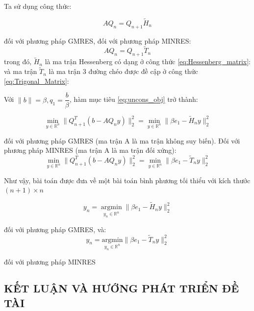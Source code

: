 \documentclass[14pt, a4paper]{article}
\numberwithin{equation}{section}
\numberwithin{algorithm}{section}
\numberwithin{figure}{section}
\numberwithin{dl}{section}
\numberwithin{md}{section}
\numberwithin{bd}{section}
\numberwithin{dn}{section}
\begin{document}
Ta sử dụng công thức:

\begin{equation}
    AQ_n = Q_{n+1}\widetilde{H}_n
\end{equation}

đối với phương pháp GMRES, đối với phương pháp MINRES:
\begin{equation}
    AQ_n = Q_{n+1} \widetilde{T}_n
\end{equation}
trong đó, $\widetilde{H}_n$ là ma trận Hessenberg có dạng ở công thức \ref{eq:Hessenberg_matrix}:
và ma trận $\widetilde{T}_n$ là ma trận 3 đường chéo được đề cập ở công thức \ref{eq:Trigonal_Matrix}:

Với $\lVert b \rVert = \beta, q_1 = \dfrac{b}{\beta}$, hàm mục tiêu \eqref{eq:uncons_obj} trở thành:

\begin{equation}
    \min_{y \in \mathbb{R}^{n}}  \lVert Q_{n+1}^T(b - AQ_n y) \rVert_2^2=\min_{y \in \mathbb{R}^{n}} \lVert \beta e_1 - \widetilde{H}_n y\rVert_2^2
\end{equation}

đối với phương pháp GMRES (ma trận A là ma trận không suy biến).
Đối với phương pháp MINRES (ma trận A là ma trận đối xứng):
\begin{equation}
    \min_{y \in \mathbb{R}^{n}}  \lVert Q_{n+1}^T(b - AQ_n y) \rVert_2^2=\min_{y \in \mathbb{R}^{n}} \lVert \beta e_1 - \widetilde{T}_n y\rVert_2^2
\end{equation}

Như vậy, bài toán được đưa về một bài toán bình phương tối thiểu với kích thước $(n+1)\times n$

\begin{equation}
    y_n = \operatorname*{argmin}_{y_n \in \mathbb{R}^{n}} \lVert \beta e_1 - \widetilde{H}_n y\rVert_2^2
\end{equation}

đối với phương pháp GMRES, và:
\begin{equation}
    y_n = \underset{y_n \in \mathbb{R}^{n}}{\mathrm{argmin}} \lVert \beta e_1 - \widetilde{T}_n y\rVert_2^2
\end{equation}

đối với phương pháp MINRES

\newpage
\begin{center}
    \section*{KẾT LUẬN VÀ HƯỚNG PHÁT TRIỂN ĐỀ TÀI}
\end{center}
\end{document}
